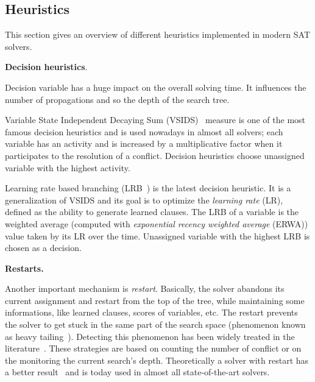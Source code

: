  
\subsection{Heuristics}\label{sec:heuristics}
This section gives an overview of different heuristics implemented in modern SAT solvers.

\textbf{Decision heuristics}.

 Decision variable has a huge impact on the 
overall solving time. It influences the number of propagations and so 
the depth of the search tree.

 Variable State Independent Decaying Sum (VSIDS)~\cite{moskewicz2001chaff} measure is one of the most famous decision heuristics and is used
nowadays in almost all solvers; each variable has an activity and  is increased by a multiplicative factor 
when it participates to the resolution of a conflict.
Decision heuristics choose unassigned variable with the highest activity.

Learning rate based branching (LRB~\cite{liang2016learning}) is the latest decision heuristic. It is a
generalization of VSIDS and its goal is to optimize the \emph{learning rate} (LR), defined as the ability to generate
learned clauses. The LRB of a variable is the weighted average (computed with \emph{exponential recency
weighted average} (ERWA))  value taken by its LR over the time. Unassigned variable with the highest LRB is chosen as a decision. 

\textbf{Restarts.}

Another important mechanism is \emph{restart}. Basically, the solver abandons its current assignment and 
restart from the top of the tree, while maintaining some informations, like learned clauses, scores of variables, etc.
 The restart prevents the solver to get stuck in the same part of the search space (phenomenon known as heavy tailing~\cite{gomes1997heavy}).
Detecting this phenomenon has been widely treated in the literature~\cite{audemard2012refining,biere2008adaptive}.
These strategies are based on counting the number of conflict or on the monitoring the current search's depth.
Theoretically a solver with restart has a better result~\cite{huang2007effect} and is today
used in almost all state-of-the-art solvers.

